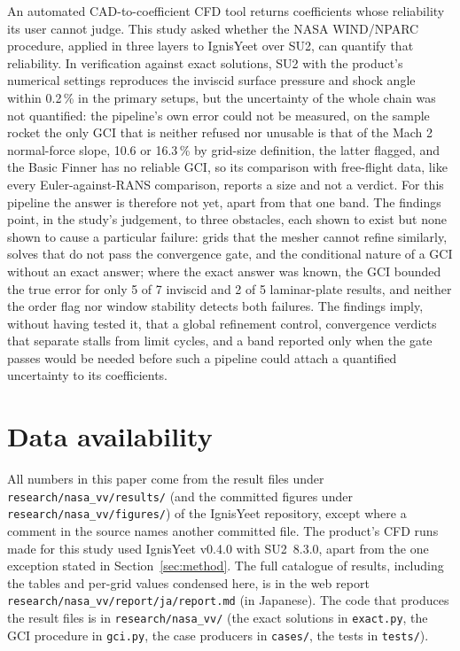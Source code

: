 \documentclass[twocolumn]{labreport}
\begin{document}
An automated CAD-to-coefficient CFD tool returns coefficients whose reliability its user cannot judge.
This study asked whether the NASA WIND/NPARC procedure, applied in three layers to IgnisYeet over SU2, can quantify that reliability.
In verification against exact solutions, SU2 with the product's numerical settings reproduces the inviscid surface pressure and shock angle within 0.2\,\% in the primary setups, but the uncertainty of the whole chain was not quantified: the pipeline's own error could not be measured, on the sample rocket the only GCI that is neither refused nor unusable is that of the Mach 2 normal-force slope, 10.6 or 16.3\,\% by grid-size definition, the latter flagged, and the Basic Finner has no reliable GCI, so its comparison with free-flight data, like every Euler-against-RANS comparison, reports a size and not a verdict.
For this pipeline the answer is therefore not yet, apart from that one band.
The findings point, in the study's judgement, to three obstacles, each shown to exist but none shown to cause a particular failure: grids that the mesher cannot refine similarly, solves that do not pass the convergence gate, and the conditional nature of a GCI without an exact answer; where the exact answer was known, the GCI bounded the true error for only 5 of 7 inviscid and 2 of 5 laminar-plate results, and neither the order flag nor window stability detects both failures.
The findings imply, without having tested it, that a global refinement control, convergence verdicts that separate stalls from limit cycles, and a band reported only when the gate passes would be needed before such a pipeline could attach a quantified uncertainty to its coefficients.

\section*{Data availability}
All numbers in this paper come from the result files under \texttt{research/nasa\_vv/results/} (and the committed figures under \texttt{research/nasa\_vv/figures/}) of the IgnisYeet repository, except where a comment in the source names another committed file.
The product's CFD runs made for this study used IgnisYeet v0.4.0 with SU2~8.3.0, apart from the one exception stated in Section~\ref{sec:method}.
The full catalogue of results, including the tables and per-grid values condensed here, is in the web report \texttt{research/nasa\_vv/report/ja/report.md} (in Japanese).
The code that produces the result files is in \texttt{research/nasa\_vv/} (the exact solutions in \texttt{exact.py}, the GCI procedure in \texttt{gci.py}, the case producers in \texttt{cases/}, the tests in \texttt{tests/}).
\end{document}
